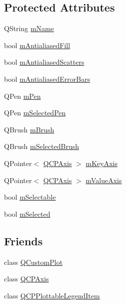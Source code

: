 \subsection*{Protected Attributes}
\begin{DoxyCompactItemize}
\item 
Q\+String \hyperlink{classQCPAbstractPlottable_ac29ffef424e2488675930de18cde612a}{m\+Name}
\item 
bool \hyperlink{classQCPAbstractPlottable_a152ac765bedf927fb240545d11d453ea}{m\+Antialiased\+Fill}
\item 
bool \hyperlink{classQCPAbstractPlottable_aa115755e525a8e3a86dc683f9cab755b}{m\+Antialiased\+Scatters}
\item 
bool \hyperlink{classQCPAbstractPlottable_ad48660b2bd301576e92fb033d8f455ea}{m\+Antialiased\+Error\+Bars}
\item 
Q\+Pen \hyperlink{classQCPAbstractPlottable_a67bc0622fd1b9fa14e54c14922dcec66}{m\+Pen}
\item 
Q\+Pen \hyperlink{classQCPAbstractPlottable_a10619472f5d5e10e9519a599f1cf5576}{m\+Selected\+Pen}
\item 
Q\+Brush \hyperlink{classQCPAbstractPlottable_a33f00674c0161c13315ab9da0895418e}{m\+Brush}
\item 
Q\+Brush \hyperlink{classQCPAbstractPlottable_aea3c0da30c7a8be23ad5f2d9bca36762}{m\+Selected\+Brush}
\item 
Q\+Pointer$<$ \hyperlink{classQCPAxis}{Q\+C\+P\+Axis} $>$ \hyperlink{classQCPAbstractPlottable_a426f42e254d0f8ce5436a868c61a6827}{m\+Key\+Axis}
\item 
Q\+Pointer$<$ \hyperlink{classQCPAxis}{Q\+C\+P\+Axis} $>$ \hyperlink{classQCPAbstractPlottable_a2901452ca4aea911a1827717934a4bda}{m\+Value\+Axis}
\item 
bool \hyperlink{classQCPAbstractPlottable_aceee52342c8e75727abcbd164986fdcb}{m\+Selectable}
\item 
bool \hyperlink{classQCPAbstractPlottable_a43f68a0603e9bcd016bdfa6d9d5c41c9}{m\+Selected}
\end{DoxyCompactItemize}
\subsection*{Friends}
\begin{DoxyCompactItemize}
\item 
class \hyperlink{classQCPAbstractPlottable_a1cdf9df76adcfae45261690aa0ca2198}{Q\+Custom\+Plot}
\item 
class \hyperlink{classQCPAbstractPlottable_af123edeca169ec7a31958a1d714e1a8a}{Q\+C\+P\+Axis}
\item 
class \hyperlink{classQCPAbstractPlottable_a104c78e91302afd6842a903e472f552f}{Q\+C\+P\+Plottable\+Legend\+Item}
\end{DoxyCompactItemize}



